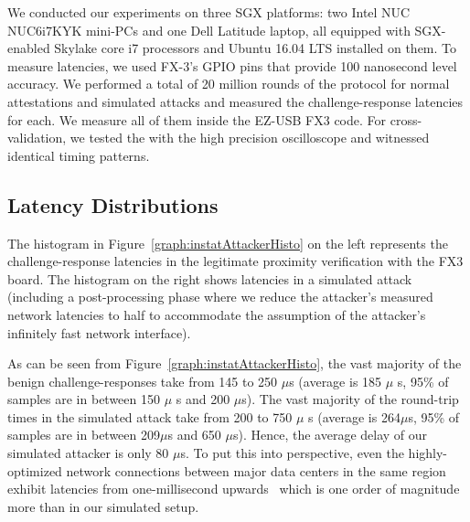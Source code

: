 We conducted our experiments on three SGX platforms: two Intel NUC NUC6i7KYK mini-PCs and one Dell Latitude laptop, all equipped with SGX-enabled Skylake core i7 processors and Ubuntu 16.04 LTS installed on them. To measure latencies, we used FX-3's GPIO pins that provide 100 nanosecond level accuracy. We performed a total of 20 million rounds of the protocol for normal attestations and simulated attacks and measured the challenge-response latencies for each. We measure all of them inside the EZ-USB FX3 code. For cross-validation, we tested the \device with the high precision oscilloscope and witnessed identical timing patterns.


\subsection{Latency Distributions}
\label{sec:evaluation:results}



The histogram in Figure~\ref{graph:instatAttackerHisto} on the left represents the challenge-response latencies in the legitimate proximity verification with the FX3 board. The histogram on the right shows latencies in a simulated attack (including a post-processing phase where we reduce the attacker's measured network latencies to half to accommodate the assumption of the attacker's infinitely fast network interface).

As can be seen from Figure~\ref{graph:instatAttackerHisto}, the vast majority of the benign challenge-responses take from 145 to 250 $\mu$s (average is 185 $\mu$ s, 95\% of samples are in between 150 $\mu$ s and  200 $\mu$s). The vast majority of the round-trip times in the simulated attack take from 200 to 750 $\mu$ s (average is 264$\mu$s, 95\% of samples are in between 209$\mu$s and 650 $\mu$s). Hence, the average delay of our simulated attacker is only 80 $\mu$s. To put this into perspective, even the highly-optimized network connections between major data centers in the same region exhibit latencies from one-millisecond upwards~\cite{agarwal_agarwal_2018} which is one order of magnitude more than in our simulated setup.



